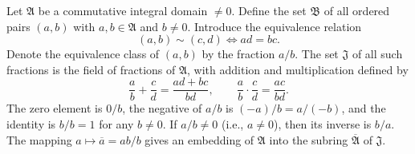 Let $\mathfrak{A}$ be a commutative integral domain $\neq 0$. Define the set $\mathfrak{B}$ of all ordered pairs $(a, b)$ with $a, b \in \mathfrak{A}$ and $b \neq 0$. Introduce the equivalence relation
$$(a, b) \sim (c, d) \iff ad = bc.$$
Denote the equivalence class of $(a, b)$ by the fraction $a/b$. The set $\mathfrak{J}$ of all such fractions is the field of fractions of $\mathfrak{A}$, with addition and multiplication defined by
$$\frac{a}{b} + \frac{c}{d} = \frac{ad + bc}{bd}, \qquad \frac{a}{b} \cdot \frac{c}{d} = \frac{ac}{bd}.$$
The zero element is $0/b$, the negative of $a/b$ is $(-a)/b = a/(-b)$, and the identity is $b/b = 1$ for any $b \neq 0$. If $a/b \neq 0$ (i.e., $a \neq 0$), then its inverse is $b/a$. The mapping $a \mapsto \overline{a} = ab/b$ gives an embedding of $\mathfrak{A}$ into the subring $\overline{\mathfrak{A}}$ of $\mathfrak{J}$.
